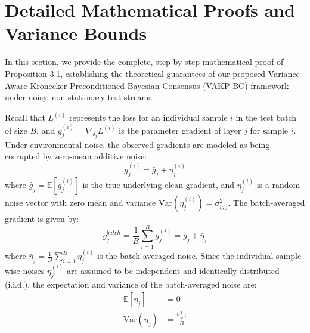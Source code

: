 \documentclass{article}
\theoremstyle{plain}
\theoremstyle{definition}
\theoremstyle{remark}
\begin{document}
\nocite{*}



\newpage
\appendix
\onecolumn
\section{Detailed Mathematical Proofs and Variance Bounds}
\label{sec:appendix_proofs}

In this section, we provide the complete, step-by-step mathematical proof of Proposition 3.1, establishing the theoretical guarantees of our proposed Variance-Aware Kronecker-Preconditioned Bayesian Consensus (VAKP-BC) framework under noisy, non-stationary test streams.

Recall that $L^{(i)}$ represents the loss for an individual sample $i$ in the test batch of size $B$, and $g_j^{(i)} = \nabla_{\delta_j} L^{(i)}$ is the parameter gradient of layer $j$ for sample $i$. Under environmental noise, the observed gradients are modeled as being corrupted by zero-mean additive noise:
\begin{equation}
    g_j^{(i)} = \bar{g}_j + \eta_j^{(i)}
\end{equation}
where $\bar{g}_j = \mathbb{E}[g_j^{(i)}]$ is the true underlying clean gradient, and $\eta_j^{(i)}$ is a random noise vector with zero mean and variance $\mathrm{Var}(\eta_j^{(i)}) = \sigma_{\eta, j}^2$. The batch-averaged gradient is given by:
\begin{equation}
    \bar{g}_j^{batch} = \frac{1}{B} \sum_{i=1}^B g_j^{(i)} = \bar{g}_j + \bar{\eta}_j
\end{equation}
where $\bar{\eta}_j = \frac{1}{B} \sum_{i=1}^B \eta_j^{(i)}$ is the batch-averaged noise. Since the individual sample-wise noises $\eta_j^{(i)}$ are assumed to be independent and identically distributed (i.i.d.), the expectation and variance of the batch-averaged noise are:
\begin{align}
    \mathbb{E}[\bar{\eta}_j] &= 0 \\
    \mathrm{Var}(\bar{\eta}_j) &= \frac{\sigma_{\eta, j}^2}{B}
\end{align}
\end{document}
